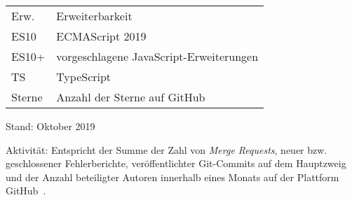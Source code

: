 \begin{table}[tb]
{\begin{minipage}[t]{.4\linewidth}
    \end{minipage}
    \begin{minipage}[t]{.55\linewidth}
      {
        \renewcommand{\arraystretch}{1.1}
        \begin{tabular}{@{}ll@{}}
          Erw. & Erweiterbarkeit\\
          ES10 & ECMAScript 2019\\
          ES10+ & vorgeschlagene JavaScript-Erweiterungen\\
          TS & TypeScript\\
          Sterne & Anzahl der Sterne auf GitHub\\
        \end{tabular}
      }
    \end{minipage}

    \vspace{\baselineskip}
    Stand: Oktober 2019
    \begin{justify}
      Aktivität: Entspricht der Summe der Zahl von \emph{Merge Requests}, neuer bzw. geschlossener Fehlerberichte, veröffentlichter Git-Commits auf dem Hauptzweig und der Anzahl beteiligter Autoren innerhalb eines Monats auf der Plattform GitHub~\autocite{GITHUB}.
    \end{justify}
  }
  \label{tab:transpilers}
\end{table}
\endgroup
